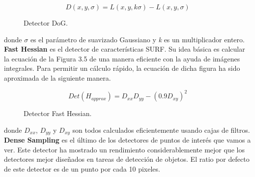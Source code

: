 \begin{figure}[htbp]
\centering
\[
D(x, y, \sigma) = L(x,y,k\sigma) - L(x,y,\sigma)
\]
\caption{Detector DoG.} 
\end{figure} 

donde $\sigma$ es el parámetro de suavizado Gaussiano y \textit{k} es un multiplicador entero. \\ 

\textbf{Fast Hessian} es el detector de características SURF. Su idea básica es calcular la ecuación de la Figura 3.5 de una manera eficiente con la ayuda de imágenes integrales. Para permitir un cálculo rápido, la ecuación de dicha figura ha sido aproximada de la siguiente manera. 

\begin{figure}[htbp]
\centering
\[
Det(H_{approx}) = D_{xx}D_{yy} - (0.9D_{xy})^2
\]
\caption{Detector Fast Hessian.} 
\end{figure}

donde $D_{xx}$, $D_{yy}$ y $D_{xy}$ son todos calculados eficientemente usando cajas de filtros. \\

\textbf{Dense Sampling} es el último de los detectores de puntos de interés que vamos a ver. Este detector ha mostrado un rendimiento considerablemente mejor que los detectores mejor diseñados en tareas de detección de objetos. El ratio por defecto de este detector es de un punto por cada 10 pixeles. 

